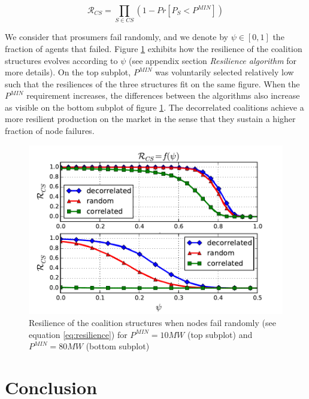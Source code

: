 \documentclass[journal]{IEEEtran}
\begin{document}
\begin{equation}
\mathcal{R}_{CS} = \prod_{S \in CS} \left( 1 - Pr[ P_{S} < P^{MIN} ] \right)
\label{eq:resilience}
\end{equation}

We consider that prosumers fail randomly, and we denote by $ \psi \in [0,1] $ the fraction of agents that failed. Figure \ref{fig:resilience} exhibits how the resilience of the coalition structures evolves according to $ \psi $ (see appendix section \textit{Resilience algorithm} for more details). On the top subplot, $ P^{MIN} $ was voluntarily selected relatively low such that the resiliences of the three structures fit on the same figure. When the $ P^{MIN} $ requirement increases, the differences between the algorithms also increase as visible on the bottom subplot of figure \ref{fig:resilience}. The decorrelated coalitions achieve a more resilient production on the market in the sense that they sustain a higher fraction of node failures.

\begin{figure}
\includegraphics[scale=.48]{./figs/figure_6}
\caption{{\footnotesize Resilience of the coalition structures when nodes fail randomly (see equation \ref{eq:resilience}) for $ P^{MIN} = 10MW $ (top subplot) and $ P^{MIN} = 80MW $ (bottom subplot)} }
\label{fig:resilience}
\end{figure}

%
%
\section{Conclusion}
\label{sec:conclusion}
\end{document}
